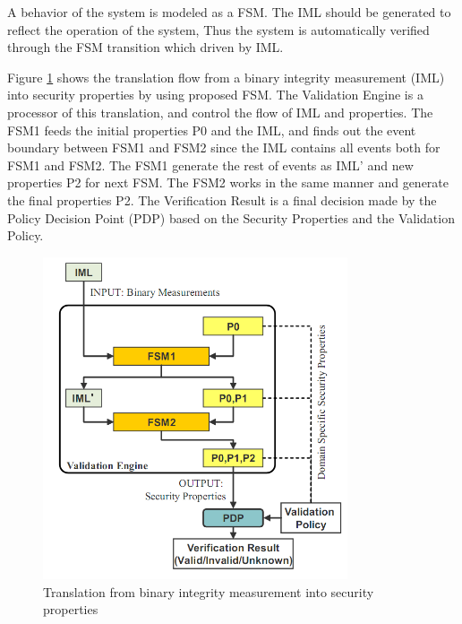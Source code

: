 \documentclass[12pt,a4paper]{article}
\begin{document}
A behavior of the system is modeled as a FSM. 
The IML should be generated to reflect the operation of the system, 
Thus the system is automatically verified through the FSM transition which driven by IML.

Figure \ref{fig:fsm} shows the translation flow from a binary integrity measurement (IML) 
into security properties by using proposed FSM. 
The Validation Engine is a processor of this translation, 
and control the flow of IML and properties. 
The FSM1 feeds the initial properties P0 and the IML, and
finds out the event boundary between FSM1 and FSM2 since the IML contains all events both for
FSM1 and FSM2. The FSM1 generate the rest of events as IML’ and new properties P2 for next
FSM. The FSM2 works in the same manner and generate the final properties P2. The Verification
Result is a final decision made by the Policy Decision Point (PDP) based on the Security Properties
and the Validation Policy.



\begin{figure}[b!p]
  \begin{center}
    \includegraphics[width=9cm]{OpenPTS_fig1.png}
  \end{center}
  \caption{Translation from binary integrity measurement into security properties}
  \label{fig:fsm} 
\end{figure}



\clearpage 
\end{document}
